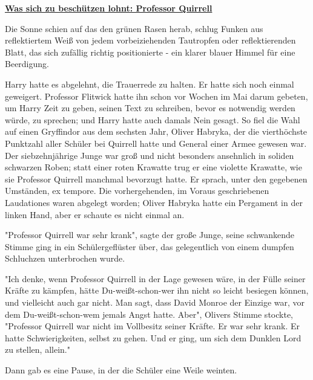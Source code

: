 

\hypertarget{was-sich-zu-beschuxfctzen-lohnt-professor-quirrell}{%

\textbf{\uline{Was sich zu beschützen lohnt: Professor Quirrell}}

Die Sonne schien auf das den grünen Rasen herab, schlug Funken aus reflektiertem Weiß von jedem vorbeiziehenden Tautropfen oder reflektierenden Blatt, das sich zufällig richtig positionierte - ein klarer blauer Himmel für eine Beerdigung.

Harry hatte es abgelehnt, die Trauerrede zu halten. Er hatte sich noch einmal geweigert. Professor Flitwick hatte ihn schon vor Wochen im Mai darum gebeten, um Harry Zeit zu geben, seinen Text zu schreiben, bevor es notwendig werden würde, zu sprechen; und Harry hatte auch damals Nein gesagt. So fiel die Wahl auf einen Gryffindor aus dem sechsten Jahr, Oliver Habryka, der die vierthöchste Punktzahl aller Schüler bei Quirrell hatte und General einer Armee gewesen war. Der siebzehnjährige Junge war groß und nicht besonders ansehnlich in soliden schwarzen Roben; statt einer roten Krawatte trug er eine violette Krawatte, wie sie Professor Quirrell manchmal bevorzugt hatte. Er sprach, unter den gegebenen Umständen, ex tempore. Die vorhergehenden, im Voraus geschriebenen Laudationes waren abgelegt worden; Oliver Habryka hatte ein Pergament in der linken Hand, aber er schaute es nicht einmal an.

"Professor Quirrell war sehr krank", sagte der große Junge, seine schwankende Stimme ging in ein Schülergeflüster über, das gelegentlich von einem dumpfen Schluchzen unterbrochen wurde.

"Ich denke, wenn Professor Quirrell in der Lage gewesen wäre, in der Fülle seiner Kräfte zu kämpfen, hätte Du-weißt-schon-wer ihn nicht so leicht besiegen können, und vielleicht auch gar nicht. Man sagt, dass David Monroe der Einzige war, vor dem Du-weißt-schon-wem jemals Angst hatte. Aber", Olivers Stimme stockte, "Professor Quirrell war nicht im Vollbesitz seiner Kräfte. Er war sehr krank. Er hatte Schwierigkeiten, selbst zu gehen. Und er ging, um sich dem Dunklen Lord zu stellen, allein."

Dann gab es eine Pause, in der die Schüler eine Weile weinten.

}
